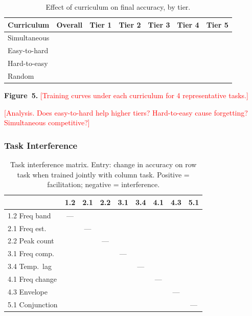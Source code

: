 \documentclass[11pt]{article}
\newcommand{\placeholder}[1]{\textcolor{red}{[#1]}}
\begin{document}
\begin{table}[t]
\centering
\small
\caption{Effect of curriculum on final accuracy, by tier.}
\label{tab:curriculum}
\begin{tabular}{lcccccc}
\toprule
\textbf{Curriculum} & \textbf{Overall} & \textbf{Tier 1} & \textbf{Tier 2} & \textbf{Tier 3} & \textbf{Tier 4} & \textbf{Tier 5} \\
\midrule
Simultaneous  &  &  &  &  &  &  \\
Easy-to-hard  &  &  &  &  &  &  \\
Hard-to-easy  &  &  &  &  &  &  \\
Random        &  &  &  &  &  &  \\
\bottomrule
\end{tabular}
\end{table}

\textbf{Figure~5.} \placeholder{Training curves under each curriculum for 4 representative tasks.}

\placeholder{Analysis. Does easy-to-hard help higher tiers? Hard-to-easy cause forgetting? Simultaneous competitive?}


\subsubsection{Task Interference}

\begin{table}[t]
\centering
\small
\caption{Task interference matrix. Entry: change in accuracy on row task when trained jointly with column task. Positive = facilitation; negative = interference.}
\label{tab:interference}
\begin{tabular}{lcccccccc}
\toprule
 & 1.2 & 2.1 & 2.2 & 3.1 & 3.4 & 4.1 & 4.3 & 5.1 \\
\midrule
1.2 Freq band     & --- &  &  &  &  &  &  &  \\
2.1 Freq est.     &  & --- &  &  &  &  &  &  \\
2.2 Peak count    &  &  & --- &  &  &  &  &  \\
3.1 Freq comp.    &  &  &  & --- &  &  &  &  \\
3.4 Temp.\ lag    &  &  &  &  & --- &  &  &  \\
4.1 Freq change   &  &  &  &  &  & --- &  &  \\
4.3 Envelope      &  &  &  &  &  &  & --- &  \\
5.1 Conjunction   &  &  &  &  &  &  &  & --- \\
\bottomrule
\end{tabular}
\end{table}
\end{document}
